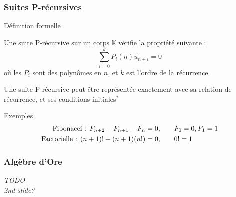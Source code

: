 \documentclass{beamer}
\begin{document}
\begin{frame}
\frametitle{Suites P-récursives}
\begin{center}
\begin{block}{Définition formelle} \begin{center}
    Une suite P-récursive sur un corps $\mathbb K$ vérifie la propriété suivante :
    \begin{equation*}
        \sum^k_{i=0} P_i(n)u_{n+i} = 0
    \end{equation*}
    où les $P_i$ sont des polynômes en $n$, et $k$ est l'ordre de la récurrence.
\end{center} \end{block}
Une suite P-récursive peut être représentée exactement avec sa relation de récurrence,
et ses conditions initiales$^*$
\begin{block}{Exemples}
    \begin{eqnarray*}
        \textnormal{Fibonacci : } F_{n+2} - F_{n+1} - F_n = 0, & \qquad F_0 = 0, F_1 = 1 \\
        \textnormal{Factorielle : } (n+1)! - (n+1)(n!) = 0, & \qquad 0! = 1 \\
    \end{eqnarray*}
\end{block}
\end{center}
\end{frame}


\begin{frame}
\frametitle{Algèbre d'Ore}
\begin{center}
\emph{TODO}\\
\emph{2nd slide?}
\end{center}
\end{frame}

\end{document}
